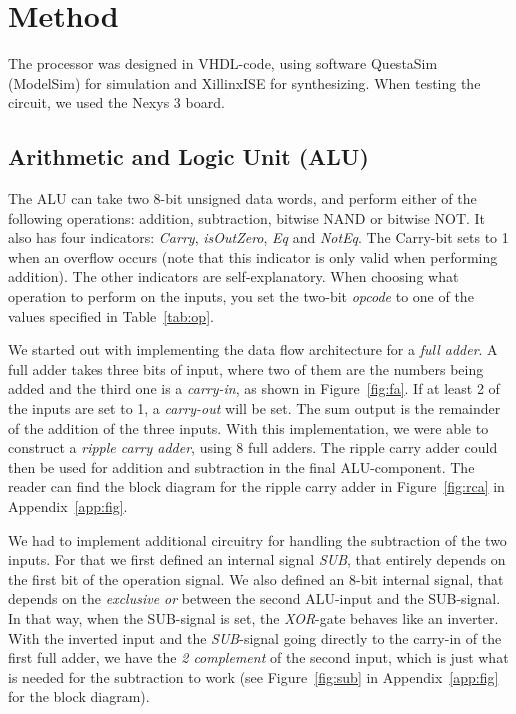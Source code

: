 \documentclass[a4,11pt]{article}
\begin{document}
\section{Method}
The processor was designed in VHDL-code, using software QuestaSim (ModelSim) for simulation and
XillinxISE for synthesizing. When testing the circuit, we used the Nexys 3 board. 

\subsection{Arithmetic and Logic Unit (ALU)}

The ALU can take two 8-bit unsigned data words, and perform either of the following operations:
addition, subtraction, bitwise NAND or bitwise NOT. It also has four indicators: {\it Carry},
{\it isOutZero}, {\it Eq} and {\it NotEq}. The Carry-bit sets to 1 when an overflow occurs
(note that this indicator is only valid when performing addition). The other indicators are
self-explanatory. When choosing what operation to perform on the inputs, you set the two-bit
{\it opcode} to one of the values specified in Table~\ref{tab:op}.

We started out with implementing the data flow architecture for a {\it full adder}. A full adder
takes three bits of input, where two of them are the numbers being added and the third one is a
{\it carry-in}, as shown in Figure~\ref{fig:fa}. If at least 2 of the inputs are set to 1, a
{\it carry-out} will be set. The sum output is the remainder of the addition of the three inputs.
With this implementation, we were able to construct a {\it ripple carry adder}, using 8 full adders.
The ripple carry adder could then be used for addition and subtraction in the final ALU-component.
The reader can find the block diagram for the ripple carry adder in Figure~\ref{fig:rca} in
Appendix~\ref{app:fig}.

We had to implement additional circuitry for handling the subtraction of the two inputs. For
that we first defined an internal signal {\it SUB}, that entirely depends on the first bit of the
operation signal. We also defined an 8-bit internal signal, that depends on the {\it exclusive
or} between the second ALU-input and the SUB-signal. In that way, when the SUB-signal
is set, the {\it XOR}-gate behaves like an inverter. With the inverted input and the {\it SUB}-signal
going directly to the carry-in of the first full adder, we have the {\it 2 complement} of the second
input, which is just what is needed for the subtraction to work (see Figure~\ref{fig:sub} in
Appendix~\ref{app:fig} for the block diagram).
\end{document}

